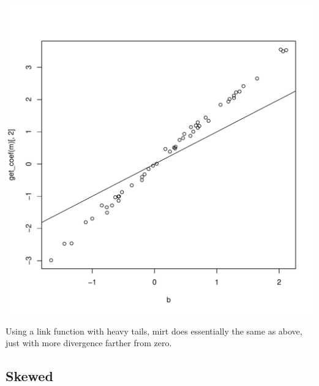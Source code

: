 \documentclass{article}\usepackage[]{graphicx}\usepackage[]{color}
\makeatletter
\def\maxwidth{ %
  \ifdim\Gin@nat@width>\linewidth
    \linewidth
  \else
    \Gin@nat@width
  \fi
}
\newenvironment{knitrout}{}{} %
\makeatother
\begin{document}
\begin{knitrout}
\color{fgcolor}
\includegraphics[width=\maxwidth]{figure/unnamed-chunk-7-1} 

\end{knitrout}

Using a link function with heavy tails, mirt does essentially the same as above, just with more divergence farther from zero.

\pagebreak
\subsection{Skewed}
\end{document}

